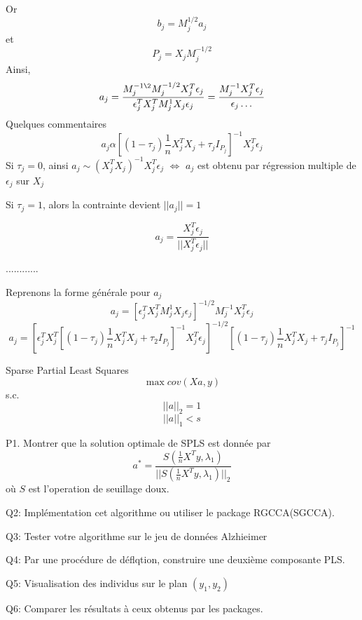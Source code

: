 \documentclass{article}
\begin{document}
Or
\begin{equation}
b_j=M_j^{1/2}a_j
\end{equation}
et
\begin{equation}
P_j=X_jM_j^{-1/2}
\end{equation}
Ainsi,
\begin{equation}
a_j=\frac{M_j^{-1\2}M_j^{-1/2}X_j^T\epsilon_j}{\epsilon_j^TX_j^TM_j^1X_j\epsilon_j}=\frac{M_j^{-1}X_j^T\epsilon_j}{\epsilon_j\ldots}
\end{equation}
Quelques commentaires
\begin{equation}
a_j\alpha [(1-\tau_j)\frac{1}{n}X^T_jX_j+\tau_jI_{P_j}]^{-1}X_j^T\epsilon_j
\end{equation}
Si $\tau_j=0$, ainsi $a_j\sim (X_j^TX_j)^{-1}X_j^T\epsilon_j$
$\Leftrightarrow$ $a_j$ est obtenu par r\'egression multiple de $\epsilon_j$ sur $X_j$

Si $\tau_j=1$, alors la contrainte devient  $||a_j||=1$

\begin{equation}
a_j=\frac{X_j^T\epsilon_j}{||X_j^T\epsilon_j||}
\end{equation}

............

Reprenons la forme g\'en\'erale pour $a_j$
\begin{equation}
a_j=[\epsilon_j^TX_j^TM_j^1X_j\epsilon_j]^{-1/2}M_j^{-1}X_j^T\epsilon_j
\end{equation}
\begin{equation}
a_j=[\epsilon_j^TX_j^T[(1-\tau_j)\frac{1}{n}X_j^TX_j+\tau_2 I_{P_j}]^{-1}X_j^T\epsilon_j]^{-1/2}[(1-\tau_j)\frac{1}{n}X_j^TX_j+\tau_j I_{P_j}]^{-1}
\end{equation}


Sparse Partial Least Squares
\begin{equation}
\max cov(Xa,y)
\end{equation}
s.c.
\begin{equation}
||a||_2=1
\end{equation}
\begin{equation}
||a||_1<s
\end{equation}

P1. Montrer que la solution optimale de SPLS est donn\'ee par 
\begin{equation}
a^*=\frac{S(\frac{1}{n}X^Ty,\lambda_1)}{||S(\frac{1}{n}X^Ty,\lambda_1)||_2}
\end{equation}
o\`u $S$ est l'operation de seuillage doux.

Q2: Impl\'ementation cet algorithme ou utiliser le package RGCCA(SGCCA).

Q3: Tester votre algorithme sur le jeu de donn\'ees Alzhieimer

Q4: Par une proc\'edure de d\'eflqtion, construire une deuxi\`eme composante PLS.

Q5: Visualisation des individus sur le plan $(y_1,y_2)$

Q6: Comparer les r\'esultats \`a ceux obtenus par les packages.
\end{document}
